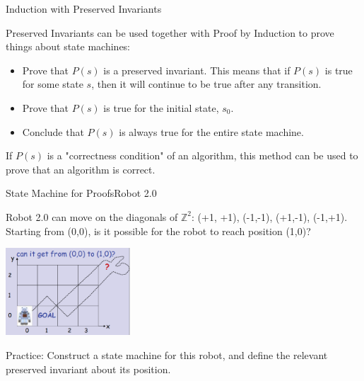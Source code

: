 \begin{frame}[t]{Induction with Preserved Invariants}

  Preserved Invariants can be used together with Proof by Induction to prove things about state machines:\bigskip

  \begin{itemize}
    \item Prove that $P(s)$ is a preserved invariant. This means that if $P(s)$ is true for some state $s$, then it will continue to be true after any transition.\medskip

    \item Prove that $P(s)$ is true for the initial state, $s_0$.\medskip

    \item Conclude that $P(s)$ is always true for the entire state machine.
  \end{itemize}\bigskip

  If $P(s)$ is a "correctness condition" of an algorithm, this method can be used to prove that an algorithm is correct.
\end{frame}


\begin{frame}{State Machine for Proofs}{Robot 2.0}

  Robot 2.0 can move on the diagonals of $\mathbb{Z}^2$: (+1,
  +1), (-1,-1), (+1,-1), (-1,+1). Starting from (0,0), is it possible for the robot to reach position (1,0)?

  \begin{center}
    \includegraphics[width=0.35\textwidth]{../img/diag_robot}
  \end{center}

  \alert{Practice}: Construct a state machine for this robot, and define the relevant preserved invariant about its position.
\end{frame}


